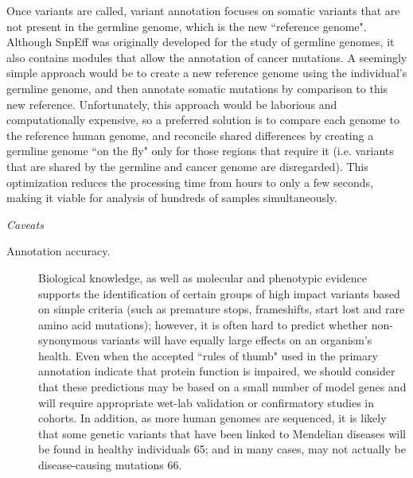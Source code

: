 Once variants are called, variant annotation focuses on somatic variants that are not present in the germline genome, which is the new ``reference genome". Although SnpEff was originally developed for the study of germline genomes, it also contains modules that allow the annotation of cancer mutations. A seemingly simple approach would be to create a new reference genome using the individual’s germline genome, and then annotate somatic mutations by comparison to this new reference. Unfortunately, this approach would be laborious and computationally expensive, so a preferred solution is to compare each genome to the reference human genome, and reconcile shared differences by creating a germline genome ``on the fly" only for those regions that require it (i.e. variants that are shared by the germline and cancer genome are disregarded). This optimization reduces the processing time from hours to only a few seconds, making it viable for analysis of hundreds of samples simultaneously.

\textit{Caveats}

	\begin{description}

	\item[Annotation accuracy.] Biological knowledge, as well as molecular and phenotypic evidence supports the identification of certain groups of high impact variants based on simple criteria (such as premature stops, frameshifts, start lost and rare amino acid mutations); however, it is often hard to predict whether non-synonymous variants will have equally large effects on an organism's health. Even when the accepted ``rules of thumb" used in the primary annotation indicate that protein function is impaired, we should consider that these predictions may be based on a small number of model genes and will require appropriate wet-lab validation or confirmatory studies in cohorts. In addition, as more human genomes are sequenced, it is likely that some genetic variants that have been linked to Mendelian diseases will be found in healthy individuals 65; and in many cases, may not actually be disease-causing mutations 66.
	
	\end{description}

